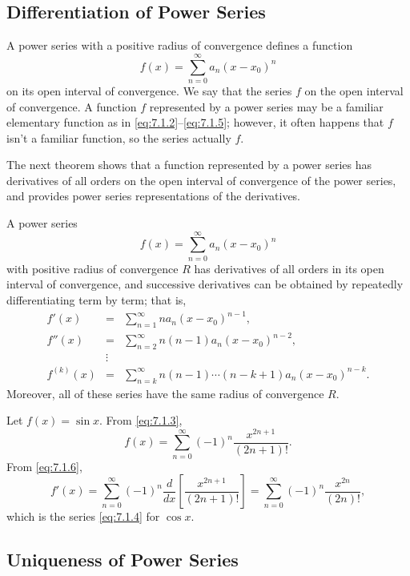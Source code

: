 \documentclass{ximera}
\begin{document}
\subsection*{Differentiation of Power Series}

A power series with a positive radius of convergence defines a
function
$$
f(x)=\sum_{n=0}^\infty a_n(x-x_0)^n
$$
on its open interval of convergence. We say that the series  $f$ on the open interval of convergence. A function $f$
represented by a power series may be a familiar elementary function
as in  \eqref{eq:7.1.2}--\eqref{eq:7.1.5};     however, it often happens
that
$f$ isn't  a familiar function,  so  the series actually   $f$.

The next  theorem shows  that a  function represented  by a power
series  has  derivatives  of  all  orders  on  the  open  interval  of
convergence  of   the  power   series,  and   provides  power  series
representations of the derivatives.

\begin{theorem}\label{thmtype:7.1.4}
A power series
$$
f(x)=\sum_{n=0}^\infty a_n(x-x_0)^n
$$
with positive radius of convergence $R$ has derivatives of all orders
in its open interval of convergence, and successive  derivatives
can be obtained by repeatedly differentiating term by term; that is,
\begin{eqnarray}
f'(x)&=&\sum_{n=1}^\infty
na_n(x-x_0)^{n-1}\label{eq:7.1.6},\\
f''(x)&=&\sum_{n=2}^\infty
n(n-1)a_n(x-x_0)^{n-2},\label{eq:7.1.7}\\
&\vdots&\nonumber\\
f^{(k)}(x)&=&\sum_{n=k}^\infty
n(n-1)\cdots(n-k+1)a_n(x-x_0)^{n-k}\label{eq:7.1.8}.
\end{eqnarray}
Moreover, all of these series have the same radius of convergence $R$.
\end{theorem}

\begin{example}\label{example:7.1.2}
Let $f(x)=\sin x$. From \eqref{eq:7.1.3},
$$
f(x)=\sum_{n=0}^\infty(-1)^n \frac{x^{2n+1}}{(2n+1)!}.
$$
From  \eqref{eq:7.1.6},
$$
f'(x)=\sum_{n=0}^\infty(-1)^n\frac{d}{dx}\left[\frac{x^{2n+1}}{(2n+1)!}\right]=
\sum_{n=0}^\infty(-1)^n \frac{x^{2n}}{(2n)!},
$$
which is the series  \eqref{eq:7.1.4} for $\cos x$.
\end{example}

\subsection*{Uniqueness of Power Series}
\end{document}
